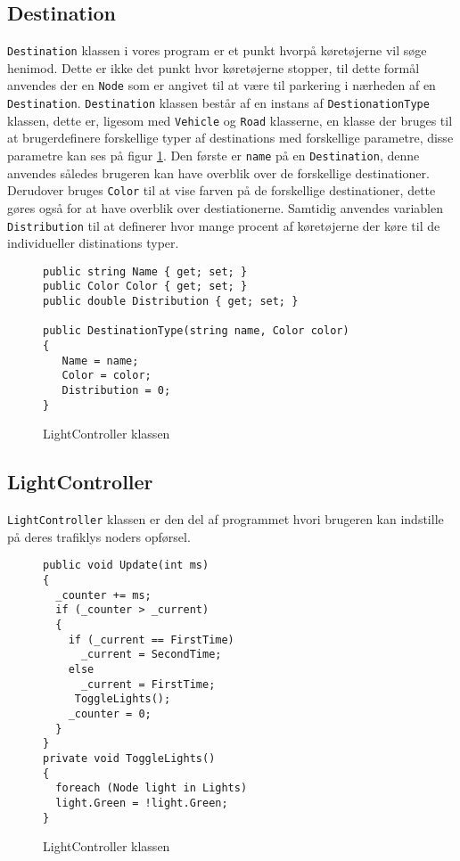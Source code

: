 \subsection{Destination}
\texttt{Destination} klassen i vores program er et punkt hvorpå køretøjerne vil søge henimod. Dette er ikke det punkt hvor køretøjerne stopper, til dette formål anvendes der en \texttt{Node} som er angivet til at være til parkering i nærheden af en \texttt{Destination}. \texttt{Destination} klassen består af en instans af \texttt{DestionationType} klassen, dette er, ligesom med \texttt{Vehicle} og \texttt{Road} klasserne, en klasse der bruges til at brugerdefinere forskellige typer af destinations med forskellige parametre, disse parametre kan ses på figur \ref{DestinationTypes}. Den første er \texttt{name} på en \texttt{Destination}, denne anvendes således brugeren kan have overblik over de forskellige destinationer. Derudover bruges \texttt{Color} til at vise farven på de forskellige destinationer, dette gøres også for at have overblik over destiationerne. Samtidig anvendes variablen \texttt{Distribution} til at definerer hvor mange procent af køretøjerne der køre til de individueller distinations typer.

\begin{figure}[H]
\begin{lstlisting}
public string Name { get; set; }
public Color Color { get; set; }
public double Distribution { get; set; }

public DestinationType(string name, Color color)
{
   Name = name;
   Color = color;
   Distribution = 0;
}
\end{lstlisting}
\caption{LightController klassen}\label{DestinationTypes}
\end{figure}

\subsection{LightController}
\texttt{LightController} klassen er den del af programmet hvori brugeren kan indstille på deres trafiklys noders opførsel.

\begin{figure}[H]
\begin{lstlisting}
public void Update(int ms)
{
  _counter += ms;
  if (_counter > _current)
  {
    if (_current == FirstTime)
      _current = SecondTime;
    else
      _current = FirstTime;
     ToggleLights();
    _counter = 0;
  }
}
private void ToggleLights()
{
  foreach (Node light in Lights)
  light.Green = !light.Green;
}
\end{lstlisting}
\caption{LightController klassen}\label{LightControllerKlassen}
\end{figure}

